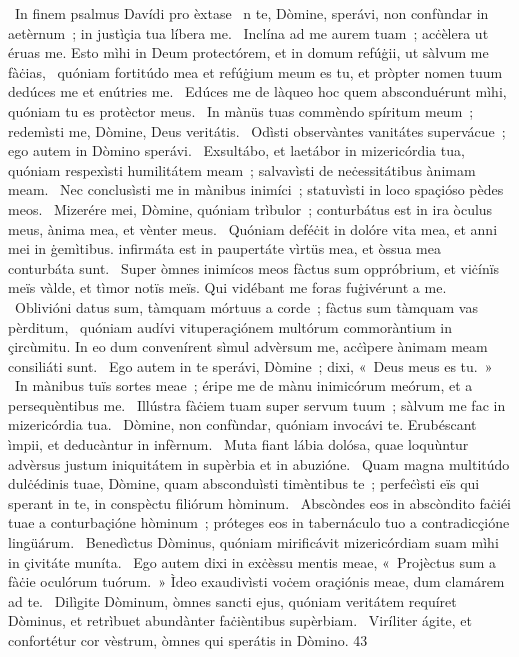 {~In finem psalmus Davídi pro èxtase}
{%
~n te, Dòmine, sperávi, non confùndar in aetèrnum~; in justìçia tua líbera me.
~Inclína ad me aurem tuam~; acċèlera ut éruas me. Esto mìhi in Deum protectórem, et in domum refúġii, ut sàlvum me fàċias,
~quóniam fortitúdo mea et refúġium meum es tu, et pròpter nomen tuum dedúces me et enútries me.
~Edúces me de làqueo hoc quem absconduérunt mìhi, quóniam tu es protèctor meus.
~In mànüs tuas commèndo spíritum meum~; redemìsti me, Dòmine, Deus veritátis.
~Odìsti observàntes vanitátes supervácue~; ego autem in Dòmino sperávi.
~Exsultábo, et laetábor in mizericórdia tua, quóniam respexìsti humilitátem meam~; salvavìsti de neċessitátibus ànimam meam.
~Nec conclusìsti me in mànibus inimíci~; statuvìsti in loco spaçióso pèdes meos.
~Mizerére mei, Dòmine, quóniam trìbulor~; conturbátus est in ira òculus meus, ànima mea, et vènter meus.
~Quóniam deféċit in dolóre vita mea, et anni mei in ġemìtibus. infirmáta est in paupertáte vìrtüs mea, et òssua mea conturbáta sunt.
~Super òmnes inimícos meos fàctus sum oppróbrium, et viċínïs meïs vàlde, et tìmor notïs meïs. Qui vidébant me foras fuġivérunt a me.
~Oblivióni datus sum, tàmquam mórtuus a corde~; fàctus sum tàmquam vas pèrditum,
~quóniam audívi vituperaçiónem multórum commoràntium in çircùmitu. In eo dum convenírent sìmul advèrsum me, acċìpere ànimam meam consiliáti sunt.
~Ego autem in te sperávi, Dòmine~; dixi, «~Deus meus es tu.~»
~In mànibus tuïs sortes meae~; éripe me de mànu inimicórum meórum, et a persequèntibus me.
~Illústra fàċiem tuam super servum tuum~; sàlvum me fac in mizericórdia tua.
~Dòmine, non confùndar, quóniam invocávi te. Erubéscant ìmpii, et deducàntur in infèrnum.
~Muta fiant lábia dolósa, quae loquùntur advèrsus justum iniquitátem in supèrbia et in abuzióne.
~Quam magna multitúdo dulċédinis tuae, Dòmine, quam absconduìsti timèntibus te~; perfeċìsti eïs qui sperant in te, in conspèctu filiórum hòminum.
~Abscòndes eos in abscòndito faċiéi tuae a conturbaçióne hòminum~; próteges eos in tabernáculo tuo a contradicçióne lingüárum.
~Benedìctus Dòminus, quóniam mirificávit mizericórdiam suam mìhi in çivitáte muníta.
~Ego autem dixi in exċèssu mentis meae, «~Projèctus sum a fàċie oculórum tuórum.~» Ìdeo exaudivìsti voċem oraçiónis meae, dum clamárem ad te.
~Dilìgite Dòminum, òmnes sancti ejus, quóniam veritátem requíret Dòminus, et retrìbuet abundànter faċièntibus supèrbiam.
~Viríliter ágite, et confortétur cor vèstrum, òmnes qui sperátis in Dòmino.}
{4}{3}
